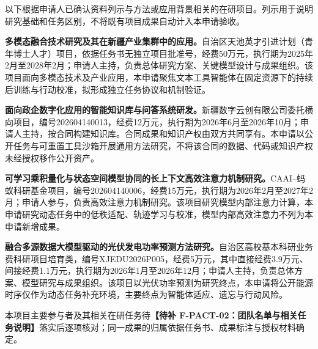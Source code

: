 \justifying
\NSFCBodyText

以下根据申请人已确认资料列示与方法或应用背景相关的在研项目。列示用于说明研究基础和任务区别，不将既有项目成果自动计入本申请验收。

\textbf{多模态融合技术研究及其在新疆产业集群中的应用。}自治区天池英才引进计划（青年博士人才）项目，依据任务书无独立项目批准号，经费50万元，执行期为2025年2月至2028年2月；申请人主持，负责总体研究方案、关键模型设计与成果组织。该项目面向多模态技术及产业应用，本申请聚焦文本工具智能体在固定资源下的持续后训练与行动校准，拟形成独立任务协议和机制验证。

\textbf{面向政企数字化应用的智能知识库与问答系统研发。}新疆数字云创有限公司委托横向项目，编号202604140013，经费12万元，执行期为2026年6月至2026年10月；申请人主持，按合同构建知识库。合同成果和知识产权由双方共同享有。本申请以公开任务与可重置工具沙箱开展通用方法研究，不将该合同的数据、代码或知识产权未经授权移作公开资产。

\textbf{可学习乘积量化与状态空间模型协同的长上下文高效注意力机制研究。}CAAI--蚂蚁科研基金项目，编号202604140006，经费15万元，执行期为2026年2月至2027年2月；申请人参与，负责高效注意力机制研究。该项目研究模型内部注意力计算，本申请研究动态任务中的低秩适配、轨迹学习与校准，模型内部高效注意力不列为本申请新增成果。

\textbf{融合多源数据大模型驱动的光伏发电功率预测方法研究。}自治区高校基本科研业务费科研项目培育类，编号XJEDU2026P005，经费5万元，其中直接经费3.9万元、间接经费1.1万元，执行期为2026年1月至2026年12月；申请人主持，负责总体方案、模型研究与成果组织。该项目以光伏功率预测为研究终点，本申请将公开能源时序仅作为动态任务补充环境，主要终点为智能体适应、遗忘与行动风险。

本项目主要参与者及其相关在研任务待\textbf{【待补 F-PACT-02：团队名单与相关任务说明】}落实后逐项核对；同一成果的归属依据任务书、成果标注与授权材料确定。
